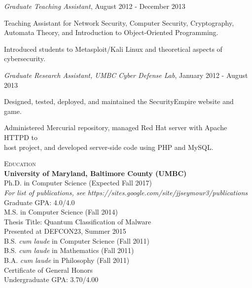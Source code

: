 \btab \textit{Graduate Teaching Assistant}, August 2012 - December 2013\\
\begin{my_list}
\item Teaching Assistant for Network Security, Computer Security, Cryptography,\\ \tab \tab Automata Theory, and Introduction to Object-Oriented Programming.
\item Introduced students to Metasploit/Kali Linux and theoretical aspects of cybersecurity.
\end{my_list}

\btab \textit{Graduate Research Assistant, UMBC Cyber Defense Lab}, January 2012 - August 2013\\
\begin{my_list}
\item Designed, tested, deployed, and maintained the SecurityEmpire website and game.
\item Administered Mercurial repository, managed Red Hat server with Apache HTTPD to\\ \tab \tab host project, and developed server-side code using PHP and MySQL.
\end{my_list}

\medskip
\textsc{Education}\\
\atab \textbf{University of Maryland, Baltimore County (UMBC)}\\
\btab Ph.D. in Computer Science (Expected Fall 2017)\\
\ctab \emph{For list of publications, see https://sites.google.com/site/jjseymour3/publications}\\
\ctab Graduate GPA: 4.0/4.0\\
\btab M.S. in Computer Science (Fall 2014)\\
\ctab Thesis Title: Quantum Classification of Malware\\
\ctab Presented at DEFCON23, Summer 2015\\
\btab B.S. \emph{cum laude} in Computer Science (Fall 2011)\\
\btab B.S. \emph{cum laude} in Mathematics (Fall 2011) \\
\btab B.A. \emph{cum laude} in Philosophy (Fall 2011)\\
\btab Certificate of General Honors\\
\ctab Undergraduate GPA: 3.70/4.00\\

